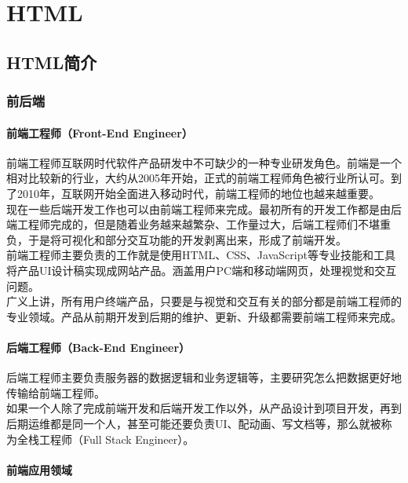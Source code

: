 \part{HTML}

\newpage

\chapter{HTML简介}

\section{前后端}

\subsection{前端工程师（Front-End Engineer）}

前端工程师互联网时代软件产品研发中不可缺少的一种专业研发角色。前端是一个相对比较新的行业，大约从2005年开始，正式的前端工程师角色被行业所认可。到了2010年，互联网开始全面进入移动时代，前端工程师的地位也越来越重要。 \\

现在一些后端开发工作也可以由前端工程师来完成。最初所有的开发工作都是由后端工程师完成的，但是随着业务越来越繁杂、工作量过大，后端工程师们不堪重负，于是将可视化和部分交互功能的开发剥离出来，形成了前端开发。 \\

前端工程师主要负责的工作就是使用HTML、CSS、JavaScript等专业技能和工具将产品UI设计稿实现成网站产品。涵盖用户PC端和移动端网页，处理视觉和交互问题。 \\

广义上讲，所有用户终端产品，只要是与视觉和交互有关的部分都是前端工程师的专业领域。产品从前期开发到后期的维护、更新、升级都需要前端工程师来完成。

\subsection{后端工程师（Back-End Engineer）}

后端工程师主要负责服务器的数据逻辑和业务逻辑等，主要研究怎么把数据更好地传输给前端工程师。 \\

如果一个人除了完成前端开发和后端开发工作以外，从产品设计到项目开发，再到后期运维都是同一个人，甚至可能还要负责UI、配动画、写文档等，那么就被称为全栈工程师（Full Stack Engineer）。

\subsection{前端应用领域}

